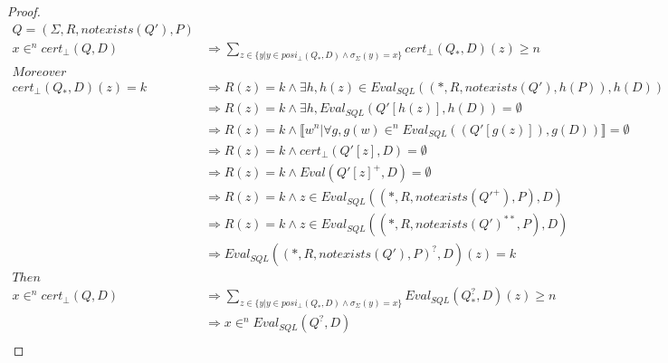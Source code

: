 \begin{proof}
	\begin{align*}
		Q = (\Sigma,R,notexists(Q'),P) \\
		x \in^n cert_\bot(Q,D) & \Rightarrow \sum_{z \in \{y | y \in posi_\bot(Q_*,D) \land \sigma_\Sigma(y) = x \} }{cert_\bot(Q_*,D)(z)} \geq n \\
		Moreover\\
		cert_\bot(Q_*,D)(z)  = k  & \Rightarrow  R(z) = k \land \exists h, h(z) \in  Eval_{SQL}((*,R,notexists(Q'),h(P)),h(D)) \\
		& \Rightarrow  R(z) = k \land  \exists h, Eval_{SQL}(Q'[h(z)],h(D)) = \emptyset \\
		&  \Rightarrow  R(z) = k \land  \llbracket w^n| \forall g, g(w) \in^n Eval_{SQL}((Q'[g(z)]),g(D)) \rrbracket = \emptyset \\ 
		&  \Rightarrow  R(z) = k \land  cert_\bot(Q'[z],D) = \emptyset \\
		&  \Rightarrow  R(z) = k \land  Eval(Q'[z]^+,D) = \emptyset \\
		&  \Rightarrow  R(z) = k \land z \in Eval_{SQL}((*,R,notexists(Q'^+),P),D) \\
		&  \Rightarrow  R(z) = k \land z \in Eval_{SQL}((*,R,notexists(Q')^{**},P),D) \\
		&  \Rightarrow  Eval_{SQL}((*,R,notexists(Q'),P)^?,D)(z) = k \\
		Then \\
		x \in^n cert_\bot(Q,D) &\Rightarrow  \sum_{z \in \{y | y \in posi_\bot(Q_*,D) \land \sigma_\Sigma(y) = x \} }{Eval_{SQL}(Q_*^?,D)(z)} \geq n \\
		& \Rightarrow x \in^n Eval_{SQL}(Q^?,D) \\
	\end{align*}
	

\end{proof}
